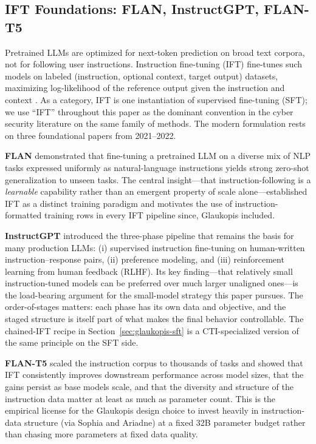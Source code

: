 \documentclass[conference]{IEEEtran}
\begin{document}
\subsection{IFT Foundations: FLAN, InstructGPT, FLAN-T5}
\label{sec:ift-foundations}

Pretrained LLMs are optimized for next-token prediction on broad text corpora, not for following user instructions. Instruction fine-tuning (IFT) fine-tunes such models on labeled (instruction, optional context, target output) datasets, maximizing log-likelihood of the reference output given the instruction and context \cite{wei2022flan,ouyang2022instructgpt}. As a category, IFT is one instantiation of supervised fine-tuning (SFT); we use ``IFT'' throughout this paper as the dominant convention in the cyber security literature on the same family of methods. The modern formulation rests on three foundational papers from 2021--2022.

\textbf{FLAN} \cite{wei2022flan} demonstrated that fine-tuning a pretrained LLM on a diverse mix of NLP tasks expressed uniformly as natural-language instructions yields strong zero-shot generalization to unseen tasks. The central insight---that instruction-following is a \emph{learnable} capability rather than an emergent property of scale alone---established IFT as a distinct training paradigm and motivates the use of instruction-formatted training rows in every IFT pipeline since, Glaukopis included.

\textbf{InstructGPT} \cite{ouyang2022instructgpt} introduced the three-phase pipeline that remains the basis for many production LLMs: (i) supervised instruction fine-tuning on human-written instruction--response pairs, (ii) preference modeling, and (iii) reinforcement learning from human feedback (RLHF). Its key finding---that relatively small instruction-tuned models can be preferred over much larger unaligned ones---is the load-bearing argument for the small-model strategy this paper pursues. The order-of-stages matters: each phase has its own data and objective, and the staged structure is itself part of what makes the final behavior controllable. The chained-IFT recipe in Section~\ref{sec:glaukopis-sft} is a CTI-specialized version of the same principle on the SFT side.

\textbf{FLAN-T5} \cite{chung2022flant5} scaled the instruction corpus to thousands of tasks and showed that IFT consistently improves downstream performance across model sizes, that the gains persist as base models scale, and that the diversity and structure of the instruction data matter at least as much as parameter count. This is the empirical license for the Glaukopis design choice to invest heavily in instruction-data structure (via Sophia and Ariadne) at a fixed 32B parameter budget rather than chasing more parameters at fixed data quality.
\end{document}
